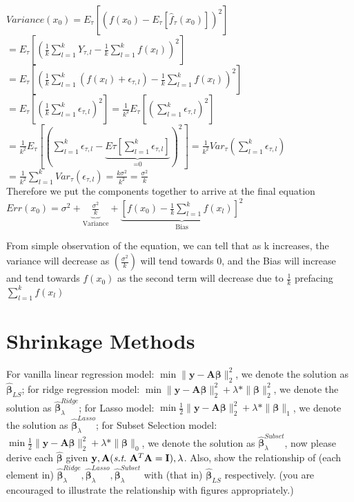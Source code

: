 \documentclass[11pt]{article}
\newcommand{\mtx}[1]{\mathbf{#1}}
\newcommand{\vct}[1]{\mathbf{#1}}
\def \mA {\mtx{A}}
\def \mI {\mtx{I}}
\def \vy {\vct{y}}
\begin{document}
\begin{flushleft}
$Variance(x_0) = E_\tau[(f(x_0) - E_\tau[\hat{f}_\tau(x_0)])^2]$\\
$= E_\tau[(\frac{1}{k}\displaystyle\sum_{l=1}^{k}Y_{\tau, l} - \frac{1}{k}\displaystyle\sum_{l=1}^{k}f(x_l))^2]$\\
$=E_\tau[(\frac{1}{k}\displaystyle\sum_{l=1}^{k}(f(x_l) + \epsilon_{\tau, l}) - \frac{1}{k}\displaystyle\sum_{l=1}^{k}f(x_l))^2]$\\
$=E_\tau[(\frac{1}{k}\displaystyle\sum_{l=1}^{k}\epsilon_{\tau, l})^2] = \frac{1}{k^2}E_\tau[(\displaystyle\sum_{l=1}^{k}\epsilon_{\tau, l})^2]$\\
$=\frac{1}{k^2}E_\tau[(\displaystyle\sum_{l=1}^{k}\epsilon_{\tau, l} - \underbrace{E\tau[\displaystyle\sum_{l=1}^{k}\epsilon_{\tau, l}]}_\text{=0})^2] = \frac{1}{k^2}Var_\tau(\displaystyle\sum_{l=1}^{k}\epsilon_{\tau, l})$\\
$=\frac{1}{k^2}\displaystyle\sum_{l=1}^{k}Var_\tau(\epsilon_{\tau, l}) = \frac{k\sigma^2}{k^2} = \frac{\sigma^2}{k}$\\
Therefore we put the components together to arrive at the final equation
$Err(x_0)=\sigma^2+\underbrace{\frac{\sigma^2}{k}}_\text{Variance}+\underbrace{[f(x_0)-\frac{1}{k}\sum_{l=1}^{k}f(x_l)]^2}_\text{Bias}$

From simple observation of the equation, we can tell that as k increases, the variance will decrease as $(\frac{\sigma^2}{k})$ will tend towards 0, and the Bias will increase and tend towards $f(x_0)$ as the second term will decrease due to $\frac{1}{k}$ prefacing $\displaystyle\sum_{l=1}^{k}f(x_l)$
\end{flushleft}

\section*{Shrinkage Methods}
For vanilla linear regression model: $\min \|\vy-\mA\bm{\beta}\|_2^2$, 
we denote the solution as $\hat{\bm{\beta}}_{LS}$; for ridge regression model: $\min \|\vy-\mA\bm{\beta}\|_2^2+\lambda*\|\bm{\beta}\|_2^2$, we denote the solution as $\hat{\bm{\beta}}_\lambda^{Ridge}$; for Lasso model: $\min \frac{1}{2}\|\vy-\mA\bm{\beta}\|_2^2+\lambda*\|\bm{\beta}\|_1$, we denote the solution as $\hat{\bm{\beta}}_\lambda^{Lasso}$; for Subset Selection model:  $\min \frac{1}{2}\|\vy-\mA\bm{\beta}\|_2^2+\lambda*\|\bm{\beta}\|_0$, we denote the solution as $\hat{\bm{\beta}}_\lambda^{Subset}$, now please derive each $\hat{\bm{\beta}}$ given $\vy, \mA  (\st \ \mA^T\mA=\mI), \lambda$. Also, show the relationship of (each element in) $\hat{\bm{\beta}}_\lambda^{Ridge}, \hat{\bm{\beta}}_\lambda^{Lasso}, \hat{\bm{\beta}}_\lambda^{Subset}$ with (that in) $\hat{\bm{\beta}}_{LS}$ respectively. (you are encouraged to illustrate the relationship with figures appropriately.)\\
\end{document}
